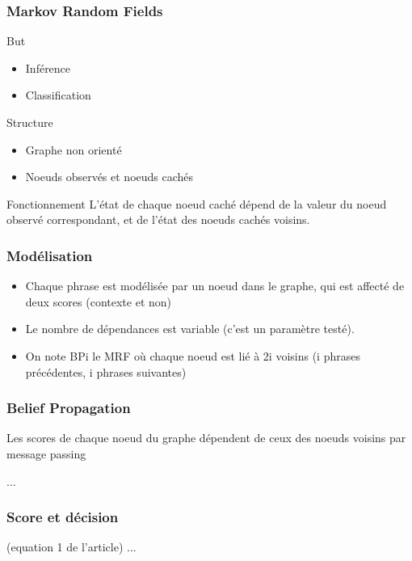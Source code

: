 \documentclass[12pt]{beamer}
\begin{document}
\begin{frame}
  \frametitle{Markov Random Fields}
  \begin{block}{But}
  \begin{itemize}
   \item Inférence
   \item Classification
  \end{itemize}
  \end{block}
  
  \begin{block}{Structure}
  \begin{itemize}
   \item Graphe non orienté
   \item Noeuds observés et noeuds cachés
  \end{itemize}
  \end{block}
  
  \begin{block}{Fonctionnement}
  L'état de chaque noeud caché dépend de la valeur du noeud observé correspondant,
  et de l'état des noeuds cachés voisins.
  \end{block}
\end{frame}

\begin{frame}
  \frametitle{Modélisation}
  \begin{itemize}
   \item Chaque phrase est modélisée par un noeud dans le graphe, qui est affecté de deux scores (contexte et non)
   \item Le nombre de dépendances est variable (c'est un paramètre testé).
   \item On note BPi le MRF où chaque noeud est lié à 2i voisins (i phrases précédentes, i phrases suivantes)
  \end{itemize}
\end{frame}

\begin{frame}
  \frametitle{Belief Propagation}
  Les scores de chaque noeud du graphe dépendent de ceux des noeuds voisins par message passing

  ...
\end{frame}

\begin{frame}
  \frametitle{Score et décision}
  (equation 1 de l'article)
  ...
\end{frame}
\end{document}
